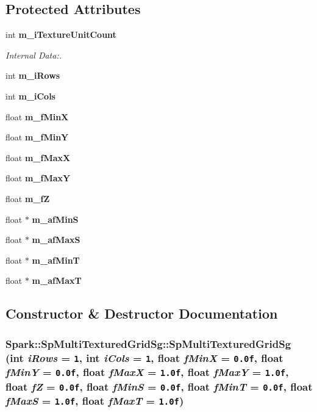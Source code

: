 \subsection*{Protected Attributes}
\begin{CompactItemize}
\item 
int {\bf m\_\-i\-Texture\-Unit\-Count}
\begin{CompactList}\small\item\em Internal Data:. \item\end{CompactList}\item 
int {\bf m\_\-i\-Rows}
\item 
int {\bf m\_\-i\-Cols}
\item 
float {\bf m\_\-f\-Min\-X}
\item 
float {\bf m\_\-f\-Min\-Y}
\item 
float {\bf m\_\-f\-Max\-X}
\item 
float {\bf m\_\-f\-Max\-Y}
\item 
float {\bf m\_\-f\-Z}
\item 
float $\ast$ {\bf m\_\-af\-Min\-S}
\item 
float $\ast$ {\bf m\_\-af\-Max\-S}
\item 
float $\ast$ {\bf m\_\-af\-Min\-T}
\item 
float $\ast$ {\bf m\_\-af\-Max\-T}
\end{CompactItemize}


\subsection{Constructor \& Destructor Documentation}
\subsubsection{\setlength{\rightskip}{0pt plus 5cm}Spark::Sp\-Multi\-Textured\-Grid\-Sg::Sp\-Multi\-Textured\-Grid\-Sg (int {\em i\-Rows} = {\tt 1}, int {\em i\-Cols} = {\tt 1}, float {\em f\-Min\-X} = {\tt 0.0f}, float {\em f\-Min\-Y} = {\tt 0.0f}, float {\em f\-Max\-X} = {\tt 1.0f}, float {\em f\-Max\-Y} = {\tt 1.0f}, float {\em f\-Z} = {\tt 0.0f}, float {\em f\-Min\-S} = {\tt 0.0f}, float {\em f\-Min\-T} = {\tt 0.0f}, float {\em f\-Max\-S} = {\tt 1.0f}, float {\em f\-Max\-T} = {\tt 1.0f})\hspace{0.3cm}{\tt  [inline]}}\label{classSpark_1_1SpMultiTexturedGridSg_a0}


